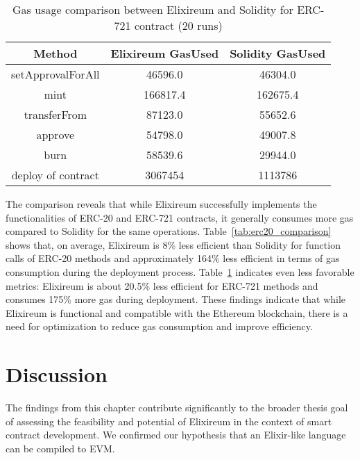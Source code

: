 \begin{table}[h!]
  \centering
  \renewcommand{\arraystretch}{1.2}
  \begin{tabular}{|c|c|c|}
  \hline
  \textbf{Method}         & \textbf{Elixireum GasUsed} & \textbf{Solidity GasUsed} \\ \hline
  setApprovalForAll       & 46596.0              & 46304.0              \\ \hline
  mint                    & 166817.4             & 162675.4             \\ \hline
  transferFrom            & 87123.0              & 55652.6              \\ \hline
  approve                 & 54798.0              & 49007.8              \\ \hline
  burn                    & 58539.6              & 29944.0              \\ \hline
  deploy of contract                 & 3067454              & 1113786              \\ \hline
  \end{tabular}
  \caption{Gas usage comparison between Elixireum and Solidity for ERC-721 contract (20 runs)}
  \label{tab:erc721_comparison}
  \end{table}

  The comparison reveals that while Elixireum successfully implements the functionalities of ERC-20 and ERC-721 contracts, it generally consumes more gas compared to Solidity for the same operations. Table~\ref{tab:erc20_comparison} shows that, on average, Elixireum is 8\% less efficient than Solidity for function calls of ERC-20 methods and approximately 164\% less efficient in terms of gas consumption during the deployment process. Table~\ref{tab:erc721_comparison} indicates even less favorable metrics: Elixireum is about 20.5\% less efficient for ERC-721 methods and consumes 175\% more gas during deployment. These findings indicate that while Elixireum is functional and compatible with the Ethereum blockchain, there is a need for optimization to reduce gas consumption and improve efficiency.

\section{Discussion}
\label{sec:discussion}

The findings from this chapter contribute significantly to the broader thesis goal of assessing the feasibility and potential of Elixireum in the context of smart contract development. We confirmed our hypothesis that an Elixir-like language can be compiled to EVM.


